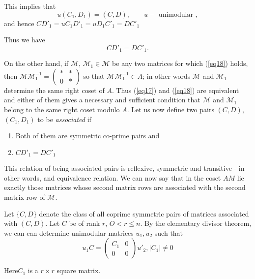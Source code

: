 This implies that
\begin{equation*}
u(C_1,D_1) = (C,D), \qquad u -\text{ unimodular }, \tag{17}\label{eq17}
\end{equation*}
and hence $CD'_1 = u   C_1   D'_1 = u   D_1   C'_1 = D   C'_1$

Thus we have
\begin{equation*}
C   D'_1 = D   C'_1. \tag{18}\label{eq18}
\end{equation*}

On the other hand, if $\mathcal{M}$, $\mathcal{M}_1 \in \mathcal{M}$
be any two matrices for which 
(\ref{eq18}) holds, then $\mathcal{M}\mathcal{M}^{-1}_1 = \begin{pmatrix} * &
  * \\ 0 & 
  * \end{pmatrix}$ so that $\mathcal{M}\mathcal{M}^{-1}_1 \in A$; in
other words $\mathcal{M}$ and 
$\mathcal{M}_1$ determine the same right coset of $A$. Thus (\ref{eq17}) and
(\ref{eq18}) are equivalent and either of them gives a necessary and sufficient 
condition that $\mathcal{M}$ and $\mathcal{M}_1$ belong to the same
right coset modulo 
$A$. Let us now define two pairs $(C, D)$, $(C_1, D_1)$ to be
\textit{associated} if   
\begin{enumerate}
\item Both of them are symmetric co-prime pairs and 
\item $CD'_1 = DC'_1$
\end{enumerate}

This relation of being associated pairs is reflexive, symmetric and
transitive - in other words, and equivalence relation. We can now say
that in the coset $AM$ lie exactly those matrices whose second matrix
rows are associated with the second matrix row of $\mathcal{M}$. 

Let $\{ C, D \}$ denote the class of all coprime symmetric pairs of
matrices associated with $(C, D)$. Let $C$ be of rank $r$, $O < r \le
n$. By the elementary divisor theorem, we can can determine unimodular
matrices $u_1, u_2$ such that  
\begin{equation*}
u_1 C =
\begin{pmatrix}
C_1 & 0 \\
 0 & 0  
\end{pmatrix}
 u'_2,   | C_1|   \neq 0 \tag{19}\label{eq19} 
\end{equation*}

Here\pageoriginale  $C_1$ is a $r \times r$ square matrix.

